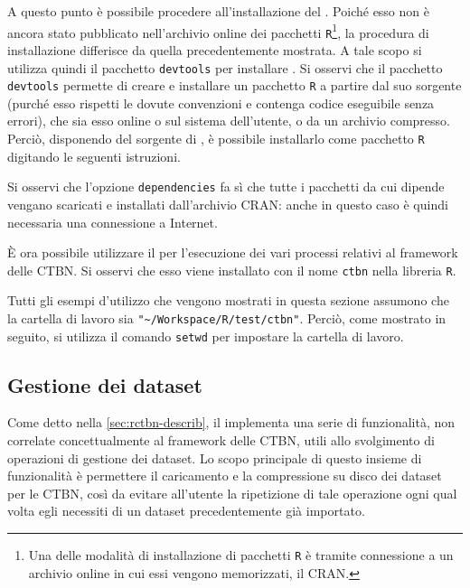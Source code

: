 A questo punto è possibile procedere all'installazione del \pacchettor{}. Poiché esso non è ancora stato pubblicato nell'archivio online dei pacchetti \lstinline$R$\footnote{Una delle modalità di installazione di pacchetti \lstinline$R$ è tramite connessione a un archivio online in cui essi vengono memorizzati, il \acs{CRAN}.}, la procedura di installazione differisce da quella precedentemente mostrata. A tale scopo si utilizza quindi il pacchetto \lstinline$devtools$ per installare \rctbn{}. Si osservi che il pacchetto \lstinline$devtools$ permette di creare e installare un pacchetto \lstinline$R$ a partire dal suo sorgente (purché esso rispetti le dovute convenzioni e contenga codice eseguibile senza errori), che sia esso online o sul sistema dell'utente, o da un archivio compresso. Perciò, disponendo del sorgente di \rctbn{}, è possibile installarlo come pacchetto \lstinline$R$ digitando le seguenti istruzioni.

\vspace*{8pt}

Si osservi che l'opzione \lstinline$dependencies$ fa sì che tutte i pacchetti da cui \rctbn{} dipende vengano scaricati e installati dall'archivio \acs{CRAN}: anche in questo caso è quindi necessaria una connessione a Internet.

\`E ora possibile utilizzare il \pacchettor{} per l'esecuzione dei vari processi relativi al framework delle \acs{CTBN}. Si osservi che esso viene installato con il nome \lstinline$ctbn$ nella libreria \lstinline$R$.

Tutti gli esempi d'utilizzo che vengono mostrati in questa sezione assumono che la cartella di lavoro sia \lstinline[language=rstats]{"~/Workspace/R/test/ctbn"}. Perciò, come mostrato in seguito, si utilizza il comando \lstinline$setwd$ per impostare la cartella di lavoro.

\subsection{Gestione dei dataset}
Come detto nella \vref{sec:rctbn-describ}, il \pacchettor{} implementa una serie di funzionalità, non correlate concettualmente al framework delle \acs{CTBN}, utili allo svolgimento di operazioni di gestione dei dataset. Lo scopo principale di questo insieme di funzionalità è permettere il caricamento e la compressione su disco dei dataset per le \acs{CTBN}, così da evitare all'utente la ripetizione di tale operazione ogni qual volta egli necessiti di un dataset precedentemente già importato.

